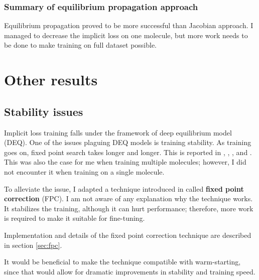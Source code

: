 \documentclass[a4paper,10.5pt]{report}
\begin{document}
\subsubsection{Summary of equilibrium propagation approach}
Equilibrium propagation proved to be more successful than Jacobian approach. I managed to decrease the implicit loss on one molecule, but more work needs to be done to make training on full dataset possible.
\section{Other results}

\subsection{Stability issues}
Implicit loss training falls under the framework of deep equilibrium model (DEQ). One of the issues plaguing DEQ models is training stability. As training goes on, fixed point search takes longer and longer. This is reported in \cite{opticalflow}, \cite{bai2021stabilizing}, \cite{burger2025dequify}, and \cite{geng2023torchdeq}. This was also the case for me when training multiple molecules; however, I did not encounter it when training on a single molecule.

To alleviate the issue, I adapted a technique introduced in \cite{opticalflow} called \textbf{fixed point correction} (FPC). I am not aware of any explanation why the technique works. It stabilizes the training, although it can hurt performance; therefore, more work is required to make it suitable for fine-tuning.

Implementation and details of the fixed point correction technique are described in section \ref{sec:fpc}.

It would be beneficial to make the technique compatible with warm-starting, since that would allow for dramatic improvements in stability and training speed.
\end{document}
